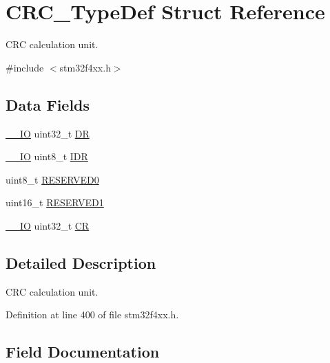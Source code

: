 \hypertarget{struct_c_r_c___type_def}{}\section{C\+R\+C\+\_\+\+Type\+Def Struct Reference}
\label{struct_c_r_c___type_def}


C\+RC calculation unit.  




{\ttfamily \#include $<$stm32f4xx.\+h$>$}

\subsection*{Data Fields}
\begin{DoxyCompactItemize}
\item 
\hyperlink{group___c_m_s_i_s__core__definitions_gaec43007d9998a0a0e01faede4133d6be}{\+\_\+\+\_\+\+IO} uint32\+\_\+t \hyperlink{struct_c_r_c___type_def_a3df0d8dfcd1ec958659ffe21eb64fa94}{DR}
\item 
\hyperlink{group___c_m_s_i_s__core__definitions_gaec43007d9998a0a0e01faede4133d6be}{\+\_\+\+\_\+\+IO} uint8\+\_\+t \hyperlink{struct_c_r_c___type_def_a601d7b0ba761c987db359b2d7173b7e0}{I\+DR}
\item 
uint8\+\_\+t \hyperlink{struct_c_r_c___type_def_aa7d2bd5481ee985778c410a7e5826b71}{R\+E\+S\+E\+R\+V\+E\+D0}
\item 
uint16\+\_\+t \hyperlink{struct_c_r_c___type_def_a8249a3955aace28d92109b391311eb30}{R\+E\+S\+E\+R\+V\+E\+D1}
\item 
\hyperlink{group___c_m_s_i_s__core__definitions_gaec43007d9998a0a0e01faede4133d6be}{\+\_\+\+\_\+\+IO} uint32\+\_\+t \hyperlink{struct_c_r_c___type_def_ab40c89c59391aaa9d9a8ec011dd0907a}{CR}
\end{DoxyCompactItemize}


\subsection{Detailed Description}
C\+RC calculation unit. 

Definition at line 400 of file stm32f4xx.\+h.



\subsection{Field Documentation}
\mbox{\label{struct_c_r_c___type_def_ab40c89c59391aaa9d9a8ec011dd0907a}} 
